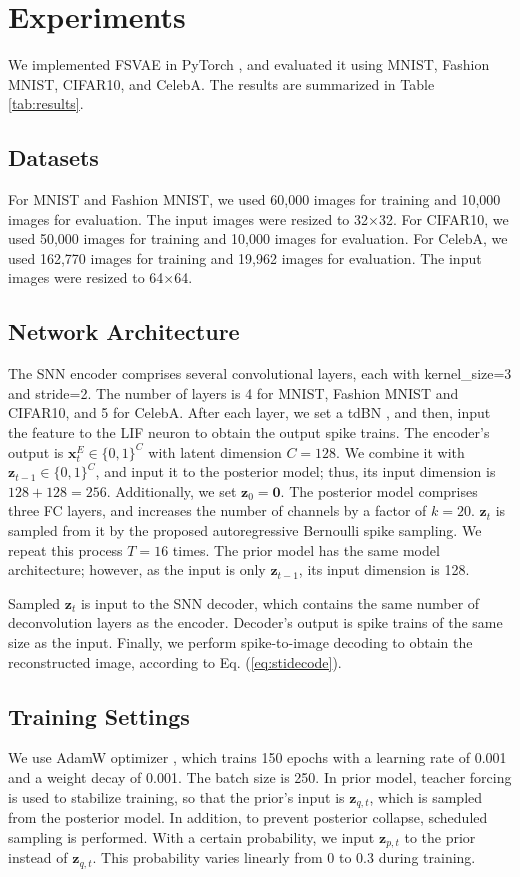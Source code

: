 \documentclass[letterpaper]{article} %
\begin{document}
\section{Experiments}
We implemented FSVAE in PyTorch \cite{pytorch}, and evaluated it using MNIST, Fashion MNIST, CIFAR10, and CelebA. The results are summarized in Table \ref{tab:results}.

\subsection{Datasets}
For MNIST and Fashion MNIST, we used 60,000 images for training and 10,000 images for evaluation. The input images were resized to 32$\times$32. For CIFAR10, we used 50,000 images for training and 10,000 images for evaluation. For CelebA, we used 162,770 images for training and 19,962 images for evaluation. The input images were resized to 64$\times$64.

\subsection{Network Architecture}

The SNN encoder comprises several convolutional layers, each with kernel\_size=3 and stride=2. The number of layers is 4 for MNIST, Fashion MNIST and CIFAR10, and 5 for CelebA. After each layer, we set a tdBN \cite{zheng2020going}, and then, input the feature to the LIF neuron to obtain the output spike trains. The encoder's output is  $\bm{x}_t^E\in\{0,1\}^C$ with latent dimension $C=128$. We combine it with $\bm{z}_{t-1}\in\{0,1\}^C$, and input it to the posterior model; thus, its input dimension is $128+128=256$. Additionally, we set $\bm{z}_{0}=\bm{0}$. The posterior model comprises three FC layers, and increases the number of channels by a factor of $k=20$. $\bm{z}_t$ is sampled from it by the proposed autoregressive Bernoulli spike sampling. We repeat this process $T=16$ times. The prior model has the same model architecture; however, as the input is only $\bm{z}_{t-1}$, its input dimension is 128.

Sampled $\bm{z}_t$ is input to the SNN decoder, which contains the same number of deconvolution layers as the encoder. Decoder's output is spike trains of the same size as the input. Finally, we perform spike-to-image decoding to obtain the reconstructed image, according to Eq. (\ref{eq:stidecode}).

\subsection{Training Settings}
We use AdamW optimizer \cite{adamw}, which trains 150 epochs with a learning rate of 0.001 and a weight decay of 0.001. The batch size is 250. In prior model, teacher forcing \cite{teacherforcing} is used to stabilize training, so that the prior's input is $\bm{z}_{q,t}$, which is sampled from the posterior model. In addition, to prevent posterior collapse, scheduled sampling \cite{scheduled} is performed. With a certain probability, we input $\bm{z}_{p,t}$ to the prior instead of $\bm{z}_{q,t}$. This probability varies linearly from 0 to 0.3 during training.
\end{document}
